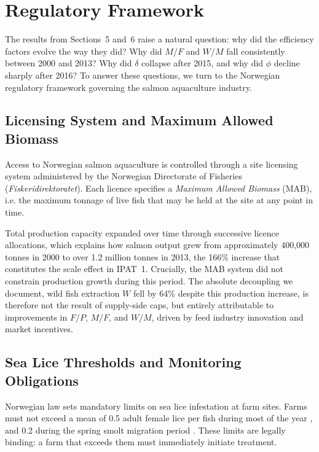 \documentclass[12pt, a4paper]{report}
\begin{document}
\chapter{Regulatory Framework}

The results from Sections~5 and~6 raise a natural question: why did the efficiency factors evolve the way they did? Why did $M/F$ and $W/M$ fall consistently between 2000 and 2013? Why did $\delta$ collapse after 2015, and why did $\phi$ decline sharply after 2016? To answer these questions, we turn to the Norwegian regulatory framework governing the salmon aquaculture industry.


\section{Licensing System and Maximum Allowed Biomass}


Access to Norwegian salmon aquaculture is controlled through a site licensing system administered by the Norwegian Directorate of Fisheries (\textit{Fiskeridirektoratet}). Each licence specifies a \textit{Maximum Allowed Biomass} (MAB), i.e. the maximum tonnage of live fish that may be held at the site at any point in time.

Total production capacity expanded over time through successive licence allocations, which explains how salmon output grew from approximately 400,000 tonnes in 2000 to over 1.2 million tonnes in 2013, the 166\% increase that constitutes the scale effect in IPAT~1. Crucially, the MAB system did not constrain production growth during this period. The absolute decoupling we document, wild fish extraction $W$ fell by 64\% despite this production increase, is therefore not the result of supply-side caps, but entirely attributable to improvements in $F/P$, $M/F$, and $W/M$, driven by feed industry innovation and market incentives.

\section{Sea Lice Thresholds and Monitoring Obligations}

Norwegian law sets mandatory limits on sea lice infestation at farm sites. Farms must not exceed a mean of 0.5 adult female lice per fish during most of the year \citep{nes2025}, and 0.2 during the spring smolt migration period \citep{nes2025, fni2023}. These limits are legally binding: a farm that exceeds them must immediately initiate treatment.
\end{document}
